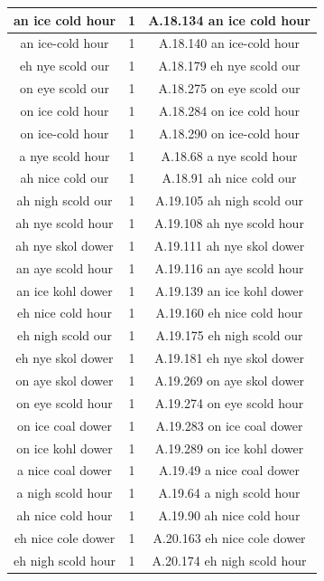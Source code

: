 \begin{center}
\begin{longtable}{|c|c|c|}
\hline 
an ice cold hour   & 1 & A.18.134    an ice cold hour  \\
\hline 
an ice-cold hour   & 1 & A.18.140    an ice-cold hour  \\
\hline 
eh nye scold our   & 1 & A.18.179    eh nye scold our  \\
\hline 
on eye scold our   & 1 & A.18.275    on eye scold our  \\
\hline 
on ice cold hour   & 1 & A.18.284    on ice cold hour  \\
\hline 
on ice-cold hour   & 1 & A.18.290    on ice-cold hour  \\
\hline 
a nye scold hour   & 1 & A.18.68    a nye scold hour  \\
\hline 
ah nice cold our   & 1 & A.18.91    ah nice cold our  \\
\hline 
ah nigh scold our   & 1 & A.19.105    ah nigh scold our  \\
\hline 
ah nye scold hour   & 1 & A.19.108    ah nye scold hour  \\
\hline 
ah nye skol dower   & 1 & A.19.111    ah nye skol dower  \\
\hline 
an aye scold hour   & 1 & A.19.116    an aye scold hour  \\
\hline 
an ice kohl dower   & 1 & A.19.139    an ice kohl dower  \\
\hline 
eh nice cold hour   & 1 & A.19.160    eh nice cold hour  \\
\hline 
eh nigh scold our   & 1 & A.19.175    eh nigh scold our  \\
\hline 
eh nye skol dower   & 1 & A.19.181    eh nye skol dower  \\
\hline 
on aye skol dower   & 1 & A.19.269    on aye skol dower  \\
\hline 
on eye scold hour   & 1 & A.19.274    on eye scold hour  \\
\hline 
on ice coal dower   & 1 & A.19.283    on ice coal dower  \\
\hline 
on ice kohl dower   & 1 & A.19.289    on ice kohl dower  \\
\hline 
a nice coal dower   & 1 & A.19.49    a nice coal dower  \\
\hline 
a nigh scold hour   & 1 & A.19.64    a nigh scold hour  \\
\hline 
ah nice cold hour   & 1 & A.19.90    ah nice cold hour  \\
\hline 
eh nice cole dower   & 1 & A.20.163    eh nice cole dower  \\
\hline 
eh nigh scold hour   & 1 & A.20.174    eh nigh scold hour  \\

\end{longtable}
\end{center}
